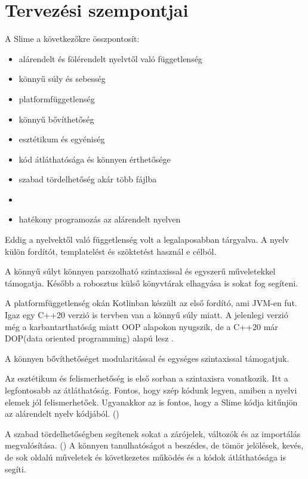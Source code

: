\section{Tervezési szempontjai}
A Slime a következőkre összpontosít:
\begin{itemize}
\item alárendelt és fölérendelt nyelvtől való függetlenség
\item könnyű súly és sebesség
\item platformfüggetlenség
\item könnyű bővíthetőség
\item esztétikum és egyéniség
\item kód átláthatósága és könnyen érthetősége
\item szabad tördelhetőség akár több fájlba
\item {}
\item hatékony programozás az alárendelt nyelven
\end{itemize}

Eddig a nyelvektől való függetlenség volt a legalaposabban tárgyalva. 
A nyelv külön fordítót, templatelést és szöktetést használ e célból.

A könnyű súlyt könnyen parszolható szintaxissal és egyszerű műveletekkel támogatja. 
Később a robosztus  külső könyvtárak elhagyása is sokat fog segíteni.

A platformfüggetlenség okán Kotlinban készült az első fordító, ami JVM-en fut. 
Igaz egy C++20 verzió is tervben van a könnyű súly miatt. 
A jelenlegi verzió még a karbantarthatóság miatt OOP alapokon nyugszik, de a C++20 már DOP(data oriented programming) alapú lesz .

A könnyen bővíthetőséget modularitással és egységes szintaxissal támogatjuk.

Az esztétikum és felismerhetőség is első sorban a szintaxisra vonatkozik. 
Itt a legfontosabb az átláthatóság. 
Fontos, hogy szép kódunk legyen, amiben a nyelvi elemek jól felismerhetőek.
Ugyanakkor az is fontos, hogy a Slime kódja kitűnjön az alárendelt nyelv kódjából. ()

A szabad tördelhetőségben segítenek sokat a zárójelek, változók és az importálás megvalósítása. () 
A könnyen tanulhatóságot a beszédes, de tömör jelölések, kevés, de sok oldalú műveletek és következetes működés és a kódok átláthatósága is segíti.

